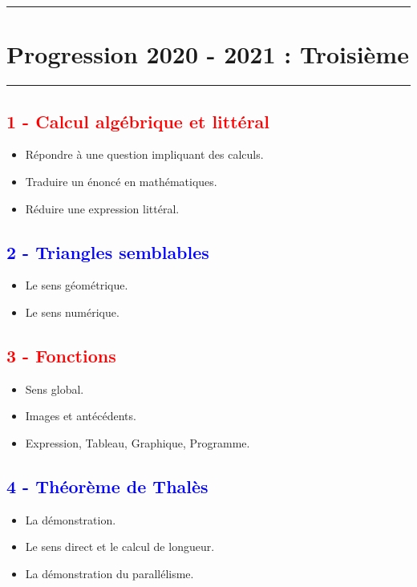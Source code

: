 \documentclass[11pt]{article}
\newcommand{\horrule}[1]{\rule{\linewidth}{#1}} %
\begin{document}
\setlength{\columnseprule}{1pt}

\horrule{2px}
\section*{Progression 2020 - 2021 : Troisième}
\horrule{2px}

\begin{multicols}{2}

\subsection*{\textcolor{red}{1 - Calcul algébrique et littéral}}

\begin{itemize}
\item Répondre à une question impliquant des calculs.
\item Traduire un énoncé en mathématiques.
\item Réduire une expression littéral.
\end{itemize}

\subsection*{\textcolor{blue}{2 - Triangles semblables}}

\begin{itemize}
\item Le sens géométrique.
\item Le sens numérique.
\end{itemize}

\subsection*{\textcolor{red}{3 - Fonctions}}

\begin{itemize}
\item Sens global.
\item Images et antécédents.
\item Expression, Tableau, Graphique, Programme.
\end{itemize}

\subsection*{\textcolor{blue}{4 - Théorème de Thalès}}

\begin{itemize}
\item La démonstration.
\item Le sens direct et le calcul de longueur.
\item La démonstration du parallélisme.
\end{itemize}


\end{multicols}
\end{document}
